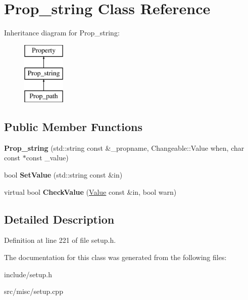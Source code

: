 \hypertarget{classProp__string}{\section{Prop\-\_\-string Class Reference}
\label{classProp__string}
}
Inheritance diagram for Prop\-\_\-string\-:\begin{figure}[H]
\begin{center}
\leavevmode
\includegraphics[height=3.000000cm]{classProp__string}
\end{center}
\end{figure}
\subsection*{Public Member Functions}
\begin{DoxyCompactItemize}
\item 
\hypertarget{classProp__string_ad7cfeff160dad431615b378934fd409f}{{\bfseries Prop\-\_\-string} (std\-::string const \&\-\_\-propname, Changeable\-::\-Value when, char const $\ast$const \-\_\-value)}\label{classProp__string_ad7cfeff160dad431615b378934fd409f}

\item 
\hypertarget{classProp__string_aa0bdbb5d31c417f314d8a4b2b3453ded}{bool {\bfseries Set\-Value} (std\-::string const \&in)}\label{classProp__string_aa0bdbb5d31c417f314d8a4b2b3453ded}

\item 
\hypertarget{classProp__string_ad1fceed071e39d195d2369e1c836ff9a}{virtual bool {\bfseries Check\-Value} (\hyperlink{classValue}{Value} const \&in, bool warn)}\label{classProp__string_ad1fceed071e39d195d2369e1c836ff9a}

\end{DoxyCompactItemize}


\subsection{Detailed Description}


Definition at line 221 of file setup.\-h.



The documentation for this class was generated from the following files\-:\begin{DoxyCompactItemize}
\item 
include/setup.\-h\item 
src/misc/setup.\-cpp\end{DoxyCompactItemize}
